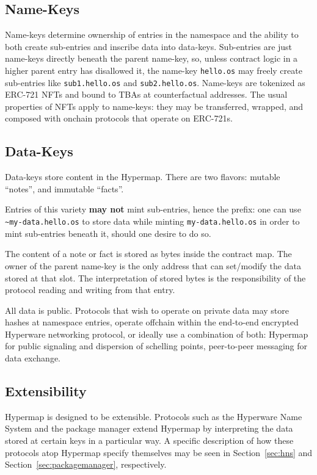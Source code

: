 \documentclass[runningheads]{llncs}
\begin{document}
\subsection{Name-Keys}

Name-keys determine ownership of entries in the namespace and the ability to both create sub-entries and inscribe data into data-keys.
Sub-entries are just name-keys directly beneath the parent name-key, so, unless contract logic in a higher parent entry has disallowed it, the name-key \verb|hello.os| may freely create sub-entries like \verb|sub1.hello.os| and \verb|sub2.hello.os|.
Name-keys are tokenized as ERC-721 NFTs and bound to TBAs at counterfactual addresses.
The usual properties of NFTs apply to name-keys: they may be transferred, wrapped, and composed with onchain protocols that operate on ERC-721s.

\subsection{Data-Keys}

Data-keys store content in the Hypermap. There are two flavors: mutable ``notes'', and immutable ``facts''.

Entries of this variety \textbf{may not} mint sub-entries, hence the prefix: one can use \verb|~my-data.hello.os| to store data while minting \verb|my-data.hello.os| in order to mint sub-entries beneath it, should one desire to do so.

The content of a note or fact is stored as bytes inside the contract map.
The owner of the parent name-key is the only address that can set/modify the data stored at that slot.
The interpretation of stored bytes is the responsibility of the protocol reading and writing from that entry.

All data is public. Protocols that wish to operate on private data may store hashes at namespace entries, operate offchain within the end-to-end encrypted Hyperware networking protocol, or ideally use a combination of both: Hypermap for public signaling and dispersion of schelling points, peer-to-peer messaging for data exchange.

\subsection{Extensibility}
\label{sec:extensibility}

Hypermap is designed to be extensible.
Protocols such as the Hyperware Name System and the package manager extend Hypermap by interpreting the data stored at certain keys in a particular way.
A specific description of how these protocols atop Hypermap specify themselves may be seen in Section~\ref{sec:hns} and Section~\ref{sec:packagemanager}, respectively.
\end{document}
